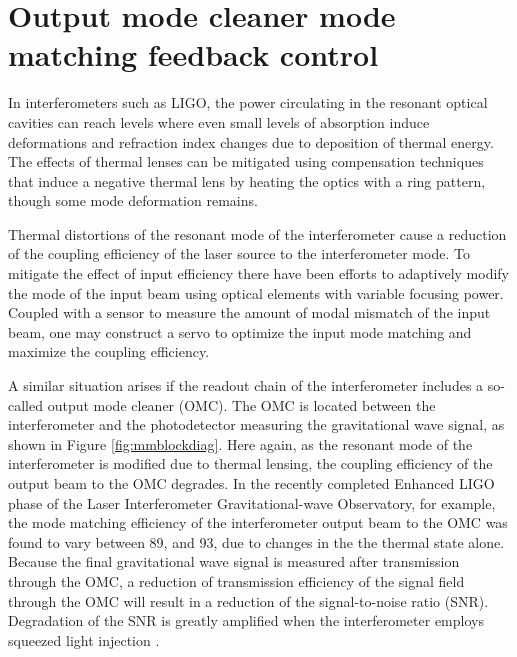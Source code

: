 \chapter{Output mode cleaner mode matching feedback control}
\label{ch:modematching}
In interferometers such as LIGO, the power circulating in the resonant optical cavities can reach levels where even small levels of absorption induce deformations and refraction index changes due to deposition of thermal energy\cite{absorptionheating}. %
The effects of thermal lenses can be mitigated using compensation techniques that induce a negative thermal lens by heating the optics with a ring pattern, though some mode deformation remains\cite{aLIGOTCS}. %


Thermal distortions of the resonant mode of the interferometer cause a reduction of the coupling efficiency of the laser source to the interferometer mode. %
To mitigate the effect of input efficiency there have been efforts to adaptively modify the mode of the input beam using optical elements with variable focusing power. %
Coupled with a sensor to measure the amount of modal mismatch of the input beam, one may construct a servo to optimize the input mode matching and maximize the coupling efficiency\cite{Arain:10,fan:104501,Mueller:00}.

A similar situation arises if the readout chain of the interferometer includes a so-called output mode cleaner (OMC). %
The OMC is located between the interferometer and the photodetector measuring the gravitational wave signal, as shown in Figure \ref{fig:mmblockdiag}. %
Here again, as the resonant mode of the interferometer is modified due to  thermal lensing, the coupling efficiency of the output beam to the OMC degrades. %
In the recently completed Enhanced LIGO phase of the Laser Interferometer Gravitational-wave Observatory, for example, the mode matching efficiency of the interferometer output beam to the OMC was found to vary between 89\perc{}, and 93\perc{}, due to changes in the the thermal state alone\cite{DooleyMMDoc}. %
Because the final gravitational wave signal is measured after transmission through the OMC, a reduction of transmission efficiency of the signal field through the OMC will result in a reduction of the signal-to-noise ratio (SNR). %
Degradation of the SNR is greatly amplified when the interferometer employs squeezed light injection \cite{GEOSqz:11}.

